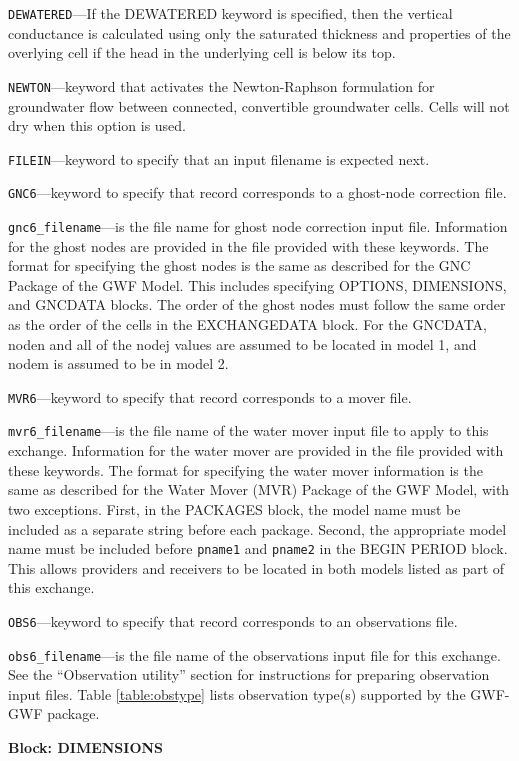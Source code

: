 \begin{description}
\item \texttt{DEWATERED}---If the DEWATERED keyword is specified, then the vertical conductance is calculated using only the saturated thickness and properties of the overlying cell if the head in the underlying cell is below its top.

\item \texttt{NEWTON}---keyword that activates the Newton-Raphson formulation for groundwater flow between connected, convertible groundwater cells. Cells will not dry when this option is used.

\item \texttt{FILEIN}---keyword to specify that an input filename is expected next.

\item \texttt{GNC6}---keyword to specify that record corresponds to a ghost-node correction file.

\item \texttt{gnc6\_filename}---is the file name for ghost node correction input file.  Information for the ghost nodes are provided in the file provided with these keywords.  The format for specifying the ghost nodes is the same as described for the GNC Package of the GWF Model.  This includes specifying OPTIONS, DIMENSIONS, and GNCDATA blocks.  The order of the ghost nodes must follow the same order as the order of the cells in the EXCHANGEDATA block.  For the GNCDATA, noden and all of the nodej values are assumed to be located in model 1, and nodem is assumed to be in model 2.

\item \texttt{MVR6}---keyword to specify that record corresponds to a mover file.

\item \texttt{mvr6\_filename}---is the file name of the water mover input file to apply to this exchange.  Information for the water mover are provided in the file provided with these keywords.  The format for specifying the water mover information is the same as described for the Water Mover (MVR) Package of the GWF Model, with two exceptions.  First, in the PACKAGES block, the model name must be included as a separate string before each package.  Second, the appropriate model name must be included before \texttt{pname1} and \texttt{pname2} in the BEGIN PERIOD block.  This allows providers and receivers to be located in both models listed as part of this exchange.

\item \texttt{OBS6}---keyword to specify that record corresponds to an observations file.

\item \texttt{obs6\_filename}---is the file name of the observations input file for this exchange. See the ``Observation utility'' section for instructions for preparing observation input files. Table \ref{table:obstype} lists observation type(s) supported by the GWF-GWF package.

\end{description}
\item \textbf{Block: DIMENSIONS}

